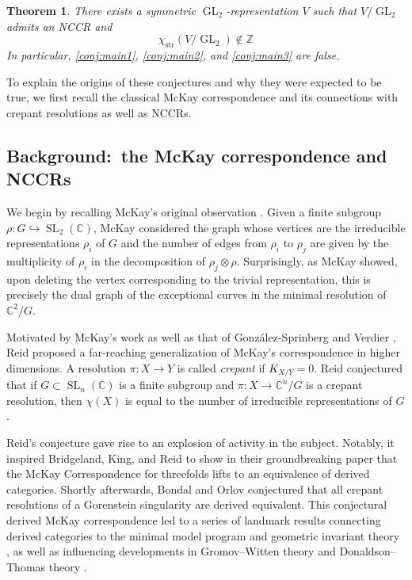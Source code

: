 \documentclass[12pt,a4paper]{amsart}
\newtheorem{theorem}{Theorem}
\theoremstyle{definition}
\newcommand{\ZZ}{\mathbb{Z}}
\newcommand{\CC}{\mathbb{C}}
\newcommand{\str}{\mathrm{str}}
\renewcommand{\1}{\textbf{1}}
\newcommand{\<}{\langle}
\renewcommand{\>}{\rangle}
\DeclareMathOperator{\GL}{GL}
\DeclareMathOperator{\SL}{SL}
\begin{document}
\begin{theorem}
There exists a symmetric $\GL_2$-representation $V$ such that $V/\GL_2$ admits an NCCR and 
\[
	\chi_{\str}(V/\GL_2)\notin\ZZ
\]
In particular, \autoref{conj:main1}, \autoref{conj:main2}, and \autoref{conj:main3} are false.
\end{theorem}

To explain the origins of these conjectures and why they were expected to be true, we first recall the classical McKay correspondence and its connections with crepant resolutions as well as NCCRs.


\subsection{Background:~the McKay correspondence and NCCRs}
We begin by recalling McKay's original observation \cite{McKay}. Given a finite subgroup $\rho\colon G\hookrightarrow\SL_2(\CC)$, McKay considered the graph whose vertices are the irreducible representations $\rho_i$ of $G$ and the number of edges from $\rho_i$ to $\rho_j$ are given by the multiplicity of $\rho_i$ in the decomposition of $\rho_j\otimes\rho$. Surprisingly, as McKay showed, upon deleting the vertex corresponding to the trivial representation, this is precisely the dual graph of the exceptional curves in the minimal resolution of $\CC^2/G$.

Motivated by McKay's work as well as that of Gonz\'alez-Sprinberg and Verdier \cite{GonzalezSprinbergVerdier1983}, Reid \cite{Reid} proposed a far-reaching generalization of McKay's correspondence in higher dimensions. A resolution $\pi\colon X\to Y$ is called \emph{crepant} if $K_{X/Y}=0$. Reid conjectured that if $G\subset\SL_n(\CC)$ is a finite subgroup and $\pi\colon X\to\CC^n/G$ is a crepant resolution, then $\chi(X)$ is equal to the number of irreducible representations of $G$.

Reid's conjecture gave rise to an explosion of activity in the subject. Notably, it inspired Bridgeland, King, and Reid to show in their groundbreaking paper \cite{BKR} that the McKay Correspondence for threefolds lifts to an equivalence of derived categories. Shortly afterwards, Bondal and Orlov \cite{BO} conjectured that all crepant resolutions of a Gorenstein singularity are derived equivalent. This conjectural derived McKay correspondence led to a series of landmark results connecting derived categories to the minimal model program \cite{BrideglandFlop,BridgelandStability} and geometric invariant theory \cite{CI,HalpernLeistner,BallardFaveroKatzarkov}, as well as influencing developments in Gromov--Witten theory \cite{Ruan06,BG,CCIT,CCITtoric,CIJ} and Donaldson--Thomas theory \cite{BCY,DTCRC}.
\end{document}
